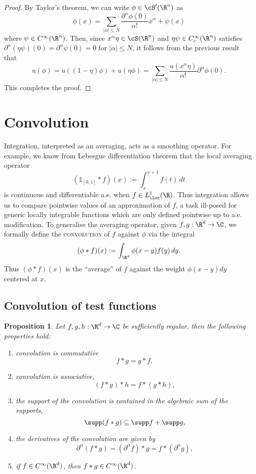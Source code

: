 \documentclass[reqno]{amsart}
\newtheorem{proposition}[theorem]{Proposition}
\theoremstyle{definition}
\theoremstyle{remark}
\renewcommand{\emph}{\textsc}
\begin{document}
\begin{proof}
	By Taylor's theorem, we can write $\phi \in \cS' (\R^n)$ as
		\[ \phi(x) = \sum_{|\alpha| \leq N}\frac{ \partial^\alpha \phi(0)}{\alpha!} x^\alpha + \psi(x) \]
	where $\psi \in C^\infty (\R^n)$. Then, since $x^\alpha \eta \in \cS (\R^n)$ and $\eta\psi \in C_c^\infty (\R^n)$ satisfies $\partial^\alpha(\eta \psi) (0) = \partial^\alpha \psi (0) = 0$ for $|\alpha| \leq N$, it follows from the previous result that
		\[ u(\phi) = u((1 - \eta) \phi) + u(\eta \phi) =  \sum_{|\alpha| \leq N}\frac{u(x^\alpha \eta)}{\alpha!} \partial^\alpha \phi(0) .\]
	This completes the proof. 	 
\end{proof}



\section{Convolution}

Integration, interpreted as an averaging, acts as a smoothing operator. For example, we know from Lebesgue differentiation theorem that the local averaging operator
	\[ (\mathbb 1_{[0, 1]} * f)(x) := \int_{x}^{x + 1} f(t) \, dt \]
is continuous and differentiable a.e. when $f \in L^1_{\loc} (\R)$. Thus integration allows us to compare pointwise values of an approximation of $f$, a task ill-posed for generic locally integrable functions which are only defined pointwise up to a.e. modification. To generalise the averaging operator, given $f, g : \R^d \to \C$, we formally define the \emph{convolution} of $f$ against $\phi$ via the integral
	\[ (\phi * f) (x) := \int_{\R^d} \phi(x - y) f(y) \, dy.  \]
Thus $(\phi * f)(x)$ is the ``average'' of $f$ against the weight $\phi(x - y) dy$ centered at $x$. 

\subsection{Convolution of test functions}

\begin{proposition}
	Let $f, g, h : \R^d \to \C$ be sufficiently regular, then the following properties hold:
	\begin{enumerate}
		\item convolution is commutative
			\[ f * g = g * f, \]
			
		\item convolution is associative, 
			\[ (f * g) * h = f * (g * h), \]
			
		\item the support of the convolution is contained in the algebraic sum of the supports, 
			\[ \supp (f * g) \subseteq \supp f + \supp g, \]		
	
		\item the derivatives of the convolution are given by 
			\[ \partial^\alpha (f * g) = (\partial^\alpha f) * g = f * (\partial^\alpha g), \]
			
		\item if $f \in C^\infty (\R^d)$, then $f * g \in C^\infty (\R^d)$. 	
	\end{enumerate}
\end{proposition}
\end{document}
